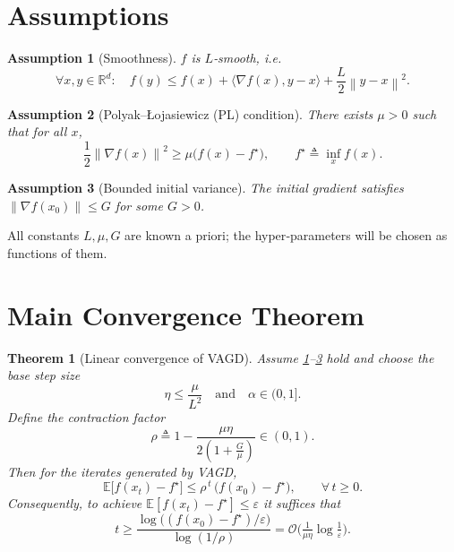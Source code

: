 \documentclass{article}
\newtheorem{theorem}{Theorem}
\newtheorem{assumption}{Assumption}
\newcommand{\EE}{\mathbb{E}}
\newcommand{\norm}[1]{\left\|#1\right\|}
\newcommand{\inner}[2]{\langle #1,#2\rangle}
\newcommand{\grad}{\nabla}
\begin{document}
\section*{Assumptions}
\begin{assumption}[Smoothness]\label{ass:smooth}
$f$ is $L$‑smooth, i.e.
\[
\forall x,y\in\mathbb{R}^{d}:\quad
f(y)\le f(x)+\inner{\grad f(x)}{y-x}+\frac{L}{2}\norm{y-x}^{2}.
\tag{A1}
\]
\end{assumption}
\begin{assumption}[Polyak–Łojasiewicz (PL) condition]\label{ass:pl}
There exists $\mu>0$ such that for all $x$,
\[
\frac{1}{2}\norm{\grad f(x)}^{2}\ge \mu\bigl(f(x)-f^{\star}\bigr),
\qquad f^{\star}\triangleq\inf_{x}f(x).
\tag{A2}
\]
\end{assumption}
\begin{assumption}[Bounded initial variance]\label{ass:bound}
The initial gradient satisfies $\norm{\grad f(x_{0})}\le G$ for some $G>0$.
\end{assumption}
All constants $L,\mu,G$ are known a priori; the hyper‑parameters will be
chosen as functions of them.

\section*{Main Convergence Theorem}
\begin{theorem}[Linear convergence of VAGD]\label{thm:linear}
Assume \ref{ass:smooth}–\ref{ass:bound} hold and choose the base step size
\[
\boxed{\eta\le \frac{\mu}{L^{2}}}\quad\text{and}\quad
\boxed{\alpha\in(0,1]}.
\tag{5}
\]
Define the contraction factor
\[
\boxed{\rho\triangleq 1-\frac{\mu\eta}{2(1+\tfrac{G}{\mu})}\in(0,1).}
\tag{6}
\]
Then for the iterates generated by VAGD,
\[
\EE\!\bigl[f(x_{t})-f^{\star}\bigr]\le \rho^{\,t}\,\bigl(f(x_{0})-f^{\star}\bigr),
\qquad\forall\,t\ge0.
\tag{7}
\]
Consequently, to achieve $\EE[f(x_{t})-f^{\star}]\le\varepsilon$ it suffices that
\[
t\ge \frac{\log\!\bigl((f(x_{0})-f^{\star})/\varepsilon\bigr)}{\log(1/\rho)}=
\mathcal{O}\!\bigl(\tfrac{1}{\mu\eta}\log\tfrac{1}{\varepsilon}\bigr).
\tag{8}
\]
\end{theorem}
\end{document}
